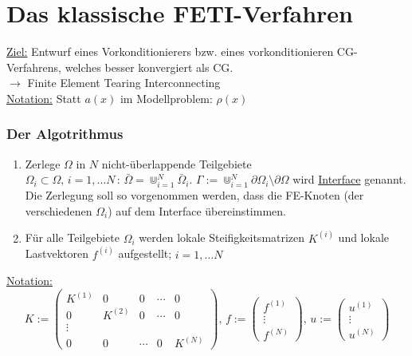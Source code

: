 \chapter {Das klassische FETI-Verfahren}

\underline{Ziel:} Entwurf eines Vorkonditionierers bzw. eines vorkonditionieren CG-Verfahrens, welches besser konvergiert als CG.\\
$\rightarrow$ Finite Element Tearing Interconnecting \\
\underline{Notation:} Statt $a(x)$ im Modellproblem: $\rho (x)$\\

\subsection{Der Algotrithmus}

\begin{enumerate}
  \item 
    Zerlege $\Omega$ in $N$ nicht-überlappende Teilgebiete $\Omega_i \subset \Omega,\, i=1,\dots N \, : \, \bar \Omega = \Cup_{i=1}^N \bar \Omega_i $. $ \Gamma := \Cup_{i=1}^N \partial \Omega_i \setminus \partial \Omega$ wird \underline{Interface} genannt.\\
    Die Zerlegung soll so vorgenommen werden, dass die FE-Knoten (der verschiedenen $\Omega_i$) auf dem Interface übereinstimmen.
  \item
    Für alle Teilgebiete $\Omega_i$ werden lokale Steifigkeitsmatrizen $K^{(i)}$ und lokale Lastvektoren $f^{(i)}$ aufgestellt; $i=1,\dots N$\\
\end{enumerate} 

\underline{Notation:}
\[ K:= \begin{pmatrix}
    K^{(1)} & 0 & 0 & \cdots & 0 \\
    0 & K^{(2)}   & 0 & \cdots  &0 \\
    \vdots\\
    0 & 0 & \cdots & 0 & K^{(N)}
  \end{pmatrix}, \,
  f:= 
  \begin{pmatrix} 
    f^{(1)} \\
    \vdots \\
    f^{(N)}
  \end{pmatrix}, \, u:=  
  \begin{pmatrix}
    u^{(1)} \\
    \vdots \\
    u^{(N)}
  \end{pmatrix}
\]

